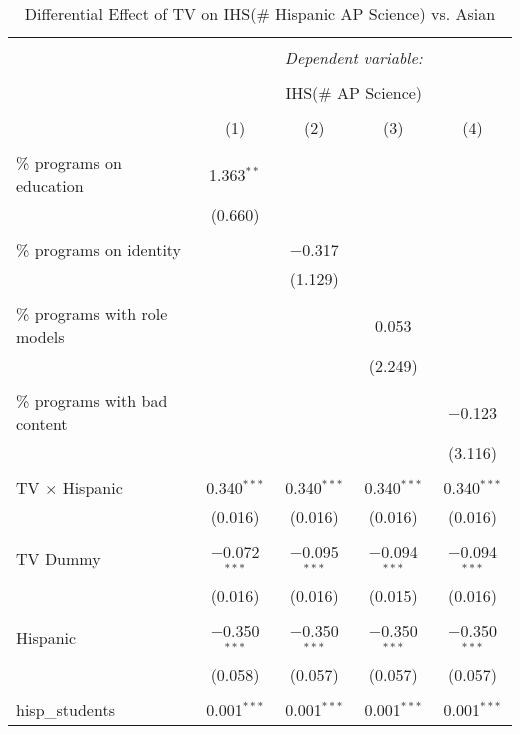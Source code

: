 
\begin{table}[!htbp] \centering 
  \caption{Differential Effect of TV on IHS(\# Hispanic AP Science) vs. Asian} 
  \label{} 
\begin{tabular}{@{\extracolsep{-2pt}}lcccc} 
\\[-1.8ex]\hline 
\hline \\[-1.8ex] 
 & \multicolumn{4}{c}{\textit{Dependent variable:}} \\ 
\cline{2-5} 
\\[-1.8ex] & \multicolumn{4}{c}{IHS(\# AP Science)} \\ 
\\[-1.8ex] & (1) & (2) & (3) & (4)\\ 
\hline \\[-1.8ex] 
 \% programs on education & 1.363$^{**}$ &  &  &  \\ 
  & (0.660) &  &  &  \\ 
  & & & & \\ 
 \% programs on identity &  & $-$0.317 &  &  \\ 
  &  & (1.129) &  &  \\ 
  & & & & \\ 
 \% programs with role models &  &  & 0.053 &  \\ 
  &  &  & (2.249) &  \\ 
  & & & & \\ 
 \% programs with bad content &  &  &  & $-$0.123 \\ 
  &  &  &  & (3.116) \\ 
  & & & & \\ 
 TV $\times$ Hispanic & 0.340$^{***}$ & 0.340$^{***}$ & 0.340$^{***}$ & 0.340$^{***}$ \\ 
  & (0.016) & (0.016) & (0.016) & (0.016) \\ 
  & & & & \\ 
 TV Dummy & $-$0.072$^{***}$ & $-$0.095$^{***}$ & $-$0.094$^{***}$ & $-$0.094$^{***}$ \\ 
  & (0.016) & (0.016) & (0.015) & (0.016) \\ 
  & & & & \\ 
 Hispanic & $-$0.350$^{***}$ & $-$0.350$^{***}$ & $-$0.350$^{***}$ & $-$0.350$^{***}$ \\ 
  & (0.058) & (0.057) & (0.057) & (0.057) \\ 
  & & & & \\ 
 hisp\_students & 0.001$^{***}$ & 0.001$^{***}$ & 0.001$^{***}$ & 0.001$^{***}$ \\ 

\end{tabular}
\end{table}
